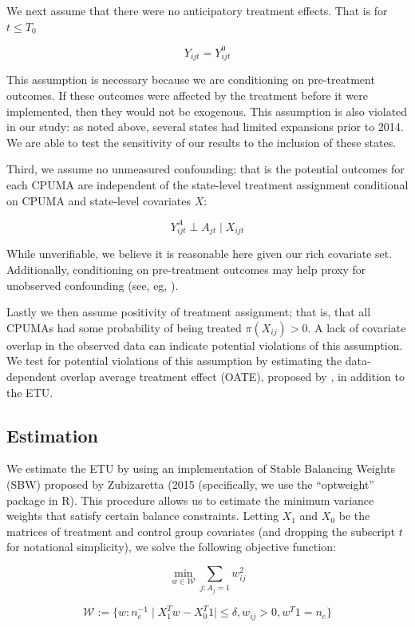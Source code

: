 \documentclass[12pt]{article}
\begin{document}
We next assume that there were no anticipatory treatment effects. That is for $t \le T_0$

$$
Y_{ijt} = Y_{ijt}^0
$$

This assumption is necessary because we are conditioning on pre-treatment outcomes. If these outcomes were affected by the treatment before it were implemented, then they would not be exogenous. This assumption is also violated in our study: as noted above, several states had limited expansions prior to 2014. We are able to test the sensitivity of our results to the inclusion of these states.

Third, we assume no unmeasured confounding; that is the potential outcomes for each CPUMA are independent of the state-level treatment assignment conditional on CPUMA and state-level covariates $X$:

$$
Y_{ijt}^A \perp A_{jt} \mid X_{ijt}
$$

While unverifiable, we believe it is reasonable here given our rich covariate set. Additionally, conditioning on pre-treatment outcomes may help proxy for unobserved confounding (see, eg, \cite{abadie2010synthetic}).

Lastly we then assume positivity of treatment assignment; that is, that all CPUMAs had some probability of being treated $\pi(X_{ij}) > 0$. A lack of covariate overlap in the observed data can indicate potential violations of this assumption. We test for potential violations of this assumption by estimating the data-dependent overlap average treatment effect (OATE), proposed by \cite{li2018balancing}, in addition to the ETU.

\subsection{Estimation}

We estimate the ETU by using an implementation of Stable Balancing Weights (SBW) proposed by Zubizaretta (2015 (specifically, we use the ``optweight'' package in R). This procedure allows us to estimate the minimum variance weights that satisfy certain balance constraints. Letting $X_1$ and $X_0$ be the matrices of treatment and control group covariates (and dropping the subscript $t$ for notational simplicity), we solve the following objective function:

$$
\min_{w \in \mathcal{W}} \sum_{j: A_j = 1} w_{ij}^2
$$

$$
\mathcal{W} := \{w: n_c^{-1} \mid X_1^Tw - X_0^T1 \mid \le \delta, w_{ij} > 0, w^T1 = n_c\}
$$
\end{document}
